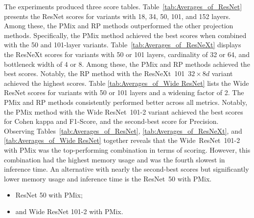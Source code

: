 The experiments produced three score tables.
Table~\ref{tab:Averages_of_ResNet} presents the ResNet scores for variants with 18, 34, 50, 101, and 152 layers. Among these, the \gls{PMix} and \gls{RP} methods outperformed the other projection methods. Specifically, the \gls{PMix} method achieved the best scores when combined with the 50 and 101-layer variants.
Table~\ref{tab:Averages_of_ResNeXt} displays the ResNeXt scores for variants with 50 or 101 layers, cardinality of 32 or 64, and bottleneck width of 4 or 8. Among these, the \gls{PMix} and \gls{RP} methods achieved the best scores. Notably, the \gls{RP} method with the \mbox{ResNeXt 101 $32\times 8d$} variant achieved the highest scores.
Table \ref{tab:Averages_of_Wide ResNet} lists the Wide ResNet scores for variants with 50 or 101 layers and a widening factor of 2. The \gls{PMix} and \gls{RP} methods consistently performed better across all metrics. Notably, the \gls{PMix} method with the Wide \mbox{ResNet 101-2} variant achieved the best scores for Cohen kappa and F1-Score, and the second-best score for Precision.
Observing Tables~\ref{tab:Averages_of_ResNet}, \ref{tab:Averages_of_ResNeXt}, and \ref{tab:Averages_of_Wide ResNet} together reveals that the \mbox{Wide ResNet 101-2} with \gls{PMix} was the top-performing combination in terms of scoring. However, this combination had the highest memory usage and was the fourth slowest in inference time. An alternative with nearly the second-best scores but significantly lower memory usage and inference time is the \mbox{ResNet 50} with \gls{PMix}.  
\begin{itemize}
	\item ResNet 50 with \gls{PMix}; 
	\item and Wide ResNet 101-2 with \gls{PMix}. 
\end{itemize}



